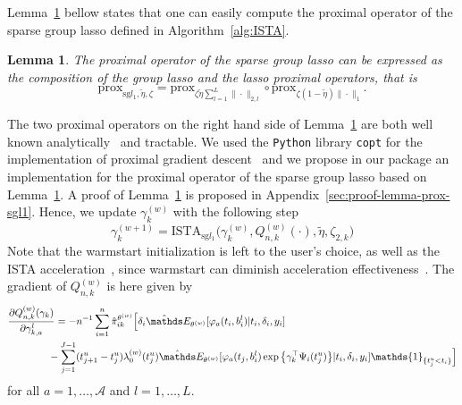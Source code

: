 \documentclass[11pt]{article}
\newtheorem{lemma}{Lemma}
\newcommand{\ind}[1]{\mathds{1}_{#1}}
\newcommand{\norm}[1]{\|#1\|}
\newcommand{\E}{\mathds E}
\begin{document}
\vspace{.5cm}
Lemma~\ref{lemma:prox-sgl1} bellow states that one can easily compute the proximal operator of the sparse group lasso defined in Algorithm~\ref{alg:ISTA}.
\begin{lemma}
\label{lemma:prox-sgl1}
The proximal operator of the sparse group lasso can be expressed as the composition of the group lasso and the lasso proximal operators, that is
\normalfont
\begin{equation*}
  \text{prox}_{\text{sg} l_1,\tilde \eta, \zeta} = \text{prox}_{\zeta \tilde \eta \sum_{l=1}^L \norm{\cdot}_{2,l}} \circ \text{prox}_{\zeta (1 - \tilde \eta) \norm{\cdot}_1}.
\end{equation*}
\end{lemma}
The two proximal operators on the right hand side of Lemma~\ref{lemma:prox-sgl1} are both well known analytically~\citep{bach2011optimization} and tractable. We used the \texttt{Python} library \texttt{copt} for the implementation of proximal gradient descent~\citep{copt} and we propose in our package an implementation for the proximal operator of the sparse group lasso based on Lemma~\ref{lemma:prox-sgl1}.
A proof of Lemma~\ref{lemma:prox-sgl1} is proposed in Appendix~\ref{sec:proof-lemma-prox-sgl1}.
Hence, we update $\gamma_k^{(w)}$ with the following step
\begin{equation}
  \label{eq:gamma-update}
  \gamma_k^{(w+1)} = \text{ISTA}_{\text{sg} l_1}\big(\gamma_k^{(w)}, Q^{(w)}_{n,k}(\cdot), \tilde \eta, \zeta_{2,k}\big)
\end{equation}
Note that the warmstart initialization is left to the user's choice, as well as the ISTA acceleration~\citep{beck2009fast}, since warmstart can diminish acceleration effectiveness~\citep{tibshirani2010proximal}. The gradient of $Q_{n,k}^{(w)}$ is here given by
\begin{align}
  \label{eq:grad-Q-2}
  &\frac{\partial Q_{n,k}^{(w)}(\gamma_k)}{\partial \gamma_{k,a}^l} = -n^{-1} \sum_{i=1}^n \hat \pi_{ik}^{\theta^{(w)}} \Big[ \delta_i  \hat \E_{\theta^{(w)}}[ \varphi_a(t_i, b_i^l) | t_i, \delta_i, y_i] \\ \nonumber
   &\qquad\qquad - \sum_{j=1}^{J-1} (t_{j+1}^u-t_j^u) \lambda_0^{(w)}(t_j^u) \hat \E_{\theta^{(w)}}[ \varphi_a(t_j, b_i^l) \exp \big\{\gamma_k^\top \Psi_i(t_j^u)\big\} | t_i, \delta_i, y_i] \ind{\{t_j^u < t_i\}} \Big]
\end{align}
for all $a = 1, \ldots, \mathcal{A}$ and $l = 1, \ldots, L$.
\end{document}
